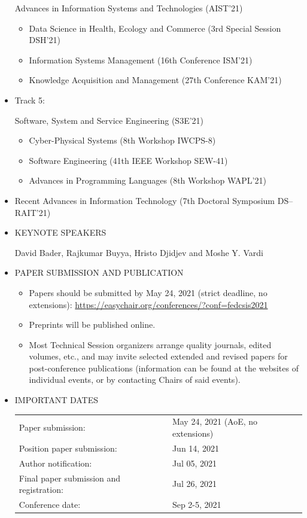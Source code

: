 \documentclass[prodmode,acmtecs]{acmsmall} %
\begin{document}
\begin{itemize}
  Advances in Information Systems and Technologies (AIST'21) 
 
\begin{itemize}\item  Data Science in Health, Ecology and Commerce (3rd Special Session DSH'21)
\item  Information Systems Management (16th Conference ISM'21)
\item  Knowledge Acquisition and Management (27th Conference KAM'21)
\end{itemize} 
\item  Track 5: 
 
  Software, System and Service Engineering (S3E'21) 
 
\begin{itemize}\item  Cyber-Physical Systems (8th Workshop IWCPS-8)
\item  Software Engineering (41th IEEE Workshop SEW-41)
\item  Advances in Programming Languages (8th Workshop WAPL'21)
\end{itemize} 
\item  Recent Advances in Information Technology (7th Doctoral Symposium DS–RAIT'21) 
 
\item  KEYNOTE SPEAKERS 
 
  David Bader, Rajkumar Buyya, Hristo Djidjev and Moshe Y. Vardi 
 
\item  PAPER SUBMISSION AND PUBLICATION 
 
\begin{itemize}\item  Papers should be submitted by May 24, 2021 (strict deadline, no extensions): \href{https://easychair.org/conferences/?conf=fedcsis2021}{https://easychair.org/conferences/?conf=fedcsis2021}
\item  Preprints will be published online.
\item  Most Technical Session organizers arrange quality journals, edited volumes, etc., and may invite selected extended and revised papers for post-conference publications (information can be found at the websites of individual events, or by contacting Chairs of said events).
\end{itemize} 
\item  IMPORTANT DATES 
 
\begin{tabulary}{\linewidth}{LL}Paper submission:  & May 24, 2021 (AoE, no extensions) \\
Position paper submission:  & Jun 14, 2021 \\
Author notification:  & Jul 05, 2021 \\
Final paper submission and registration:  & Jul 26, 2021 \\
Conference date:  & Sep 2-5, 2021 \\
\end{tabulary}
 

\end{itemize}
\end{document}
